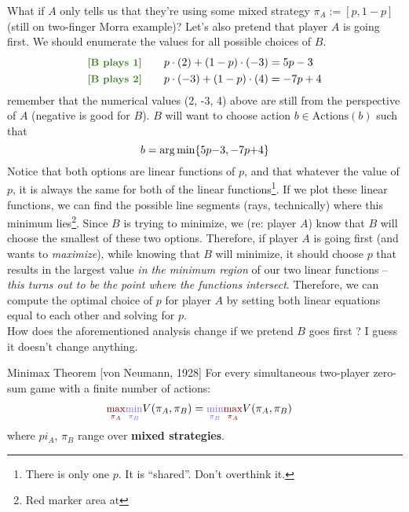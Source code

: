 \documentclass[11pt]{article}
\begin{document}
What if $A$ only tells us that they're using some mixed strategy $\pi_A := [p, 1-p]$ (still on two-finger Morra example)? Let's also pretend that player $A$ is going first. We should enumerate the values for all possible choices of $B$.
\begin{align}
	\mtgreen{[B plays 1]}\qquad&
		p \cdot (2) + (1 - p) \cdot (-3) = 5p - 3 \\
	\mtgreen{[B plays 2]}\qquad& 
		p \cdot (-3) + (1 - p) \cdot (4) = -7p + 4
\end{align}
remember that the numerical values (2, -3, 4) above are still from the perspective of $A$ (negative is good for $B$). $B$ will want to choose action $b \in \text{Actions}(b)$ such that
$$
	b = \operatorname*{arg\,min}\{ 5p {-} 3,  -7p {+} 4  \}
$$
Notice that both options are linear functions of $p$, and that whatever the value of $p$, it is always the same for both of the linear functions\footnote{There is only one $p$. It is ``shared''. Don't overthink it.}. If we plot these linear functions, we can find the possible line segments (rays, technically) where this minimum lies\footnote{Red marker area at }. Since $B$ is trying to minimize, we (re: player $A$) know that $B$ will choose the smallest of these two options. Therefore, if player $A$ is going first (and wants to \textit{maximize}), while knowing that $B$ will minimize, it should choose $p$ that results in the largest value \textit{in the minimum region} of our two linear functions -- \textit{this turns out to be the point where the functions intersect}. Therefore, we can compute the optimal choice of $p$ for player $A$ by setting both linear equations equal to each other and solving for $p$. \\

How does the aforementioned analysis change if we pretend $B$ goes first ? I guess it doesn't change anything.


\begin{definition}{Minimax Theorem [von Neumann, 1928]}
	For every simultaneous two-player zero-sum game with a finite number of actions:
	\begin{align}
		\mred{\max_{\pi_A}} 	\mblue{\min_{\pi_B}} V(\pi_A, \pi_B)
		&= \mblue{\min_{\pi_B} } \mred{\max_{\pi_A}} V(\pi_A, \pi_B)
	\end{align}
	where $pi_A$, $\pi_B$ range over \textbf{mixed strategies}.
\end{definition}
\end{document}
